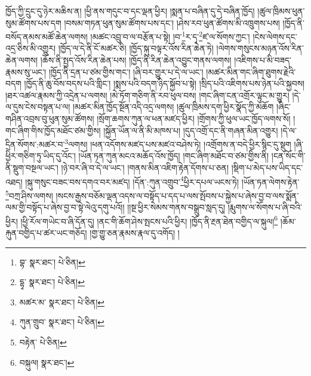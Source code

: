 ཁྱོད་ཀྱི་དྲུང་དུ་ཉེར་མཆིས་ན། །ཕྱི་ནས་གདུང་བ་དང་ལྡན་ཕྱིར། །སྨན་པ་བཞིན་དུ་དེ་བཞིན་ཁྱོད། །ཚུལ་ཁྲིམས་ཕུན་སུམ་ཚོགས་པས་དག །བསམ་གཏན་ཕུན་སུམ་ཚོགས་པས་དང་། །ཤེས་རབ་ཕུན་ཚོགས་མི་འཁྲུགས་པས། །ཁྱོད་ནི་བསོད་ནམས་མཚོ་ཆེན་ལགས། །མཚང་འབྲུ་བ་ལ་བརྩོན་པ་སྟེ། །བ་\footnote{བྷ་  སྣར་ཐང་།  པེ་ཅིན། }ར་དྭ་\footnote{དྷྭ་  སྣར་ཐང་།  པེ་ཅིན། }ཛ་ལ་སོགས་ཀྱང་། །ངེས་ལེགས་དང་འདྲ་ཅིས་མི་འགྱུར། །ཁྱོད་ལ་དེ་ནི་ངོ་མཚར་ཅི། །ཁྱོད་སྐུ་བལྟར་འོས་རིན་ཆེན་ཏེ། །ལེགས་གསུངས་མཉན་འོས་རིན་ཆེན་ལགས། །ཆོས་ནི་སྤྱད་འོས་རིན་ཆེན་པས། །ཁྱོད་ནི་རིན་ཆེན་འབྱུང་གནས་ལགས། །འཇིགས་པ་མི་བཟད་རྣམས་སུ་ཡང་། །ཁྱོད་ནི་དྲན་པ་ཙམ་གྱིས་གང་། །ཞི་བར་གྱུར་པ་དེ་ལ་ཡང་། །མཚར་མིན་གང་ཞིག་ཐུགས་རྗེའི་བདག །ཁྱོད་ནི་ཆུ་བོས་བདས་པའི་གླིང་། །སྨས་པའི་བདག་ཉིད་སྐྱོབ་པ་སྟེ། །སྲིད་པའི་འཇིགས་པས་ཉེན་པའི་སྐྱབས། །ཐར་འཚལ་རྣམས་ཀྱི་འདྲེན་པ་ལགས། །མེ་ཏོག་གཅིག་ནི་རབ་ཕུལ་བས། །གང་ཞིག་ངན་འགྲོར་ལྟུང་མ་གྱུར། །དེ་ལ་དུས་ངེས་བསྟན་པ་ལ། །མཚར་མིན་ཁྱོད་སྔོན་འདི་འདྲ་ལགས། །ཚུལ་ཁྲིམས་དག་ཕྱིར་སྣོད་ཀྱི་མཆོག །ཞིང་གཤིན་འབྲས་བུ་ཕུན་སུམ་ཚོགས། །སྲོག་ཆགས་ཀུན་ལ་ཕན་མཛད་ཕྱིར། །གྲོགས་ཀྱི་ཕུལ་ཡང་ཁྱོད་ལགས་སོ། །གང་ཞིག་གིས་ཁྱོད་མཐོང་ཙམ་གྱིས། །སྐྱོན་ཡོན་ལ་ནི་མི་མཁས་པ། །དུད་འགྲོ་དང་ནི་གཞན་མིན་འགྱུར། །དེ་ལ་དྲིན་སོགས་:མཚར་བ་\footnote{མཚར་མ་  སྣར་ཐང་།  པེ་ཅིན། }ལགས། །ཕན་འདོགས་མཛད་པས་མཛའ་བཤེས་ཏེ། །འགྲོགས་ན་བདེ་ཕྱིར་སྙིང་དུ་སྡུག །ཞི་ཕྱིར་གཅིག་ཏུ་ཡིད་དུ་འོང་། །ཡོན་ཏན་ཀུན་མངའ་མཆོད་འོས་ཁྱོད། །གང་ཞིག་མཐོང་བ་ཙམ་གྱིས་ནི། །ངན་སོང་གི་ནི་སྡུག་བསྔལ་ཡང་། །ཉེ་བར་ཞི་བ་དེ་ལ་ཡང་། །གནས་མིན་འཇིག་རྟེན་དོགས་པ་ཅན། །སྡིག་པ་མེད་པས་ཡིད་དང་འཐད། །སྐུ་གསུང་བཟང་བས་དགའ་བར་མཛད། །དོན་:ཀུན་འགྲུབ་\footnote{ཀུན་གྲུབ་  སྣར་ཐང་།  པེ་ཅིན། }ཕྱིར་དཔལ་ཡངས་ཏེ། །ཡོན་ཏན་ལེགས་རྟེན་\footnote{བརྟེན་  པེ་ཅིན། }བཀྲ་ཤིས་ལགས། །སངས་རྒྱས་བཅོམ་ལྡན་འདས་ལ་བསྟོད་པ་དད་པ་ལས་སྤོབས་པ་སྐྱེས་པ་ཞེས་བྱ་བ་ལས་སྨོན་ལམ་གྱི་བསྟོད་པ་ཞེས་བྱ་བ་སྟེ་ལེའུ་དགུ་པའོ།། །།སྔ་ཕྱིར་སེམས་གནས་བསྒྲུབ་སླད་དུ། །རྨུགས་ལ་སོགས་པ་ཞི་བའི་ཕྱིར། །ཕྱི་རོལ་གཡེང་བ་ཞི་དོན་དུ། །ནང་གི་ཆོག་ཤེས་སྤངས་པའི་ཕྱིར། །ཁྱོད་ནི་རྔན་ཐེན་བགྱིད་ལ་སྐུལ།\footnote{བསྐུལ།  སྣར་ཐང་། } །ཆོམ་རྐུན་བགྱིད་པ་ཚར་ཡང་གཅོད། །གྱ་གྱུ་ཅན་རྣམས་རྣལ་དུ་འགོད། །
